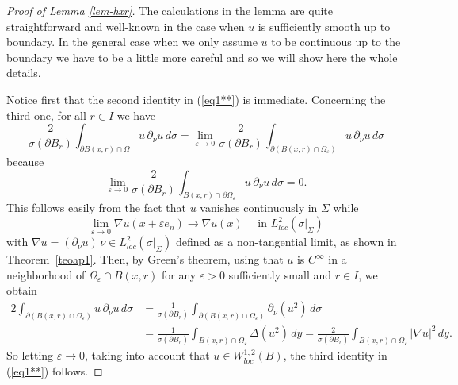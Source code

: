 \documentclass[11pt]{amsart}
\newcommand{\rf}[1]{{(\ref{#1})}}
\newcommand{\ve}{{\varepsilon}}
\theoremstyle{definition}
\theoremstyle{remark}
\numberwithin{equation}{section}
\begin{document}
\begin{proof}[Proof of Lemma \ref{lem-hxr}]
The calculations in the lemma are quite straightforward and well-known in the case when $u$ is
sufficiently smooth up to boundary. In the general case when we only assume $u$ to be continuous
up to the boundary we have to be a little more careful and so we will show here the whole details.

Notice first that the second identity in \rf{eq1**} is immediate. Concerning the third one, for all $r\in I$ we have
$$\frac2{\sigma(\partial B_r)} \int_{\partial B(x,r)\cap \Omega} u\,\partial_\nu  u\,d\sigma
=\lim_{\ve \to 0} \frac2{\sigma(\partial B_r)} \int_{\partial (B(x,r)\cap \Omega_\ve)} u\,\partial_\nu  u\,d\sigma$$
because
$$\lim_{\ve \to 0} \frac2{\sigma(\partial B_r)} \int_{B(x,r)\cap \partial\Omega_\ve} u\,\partial_\nu  u\,d\sigma=0.$$
This follows easily from the fact that $u$ vanishes continuously in $\Sigma$ while 
\begin{equation}\label{eqnablaupart}
\lim_{\ve\to0} \nabla u(x+\ve e_n) \to \nabla u(x) \quad \mbox{ in $L^2_{loc}(\sigma|_\Sigma)$}
\end{equation}
with $\nabla u = (\partial_\nu u) \,\nu\in L^2_{loc}(\sigma|_\Sigma)$ defined as a non-tangential 
limit, as shown in Theorem~\ref{teoap1}.
Then, by Green's theorem, using that $u$ is $C^\infty$ in a neighborhood of $\Omega_\ve\cap B(x,r)$ for any $\ve>0$ sufficiently small and $r\in I$, we obtain
\begin{align*}
2\int_{\partial (B(x,r)\cap \Omega_\ve)} u\,\partial_\nu  u\,d\sigma &= \frac1{\sigma(\partial B_r)} \int_{\partial (B(x,r)\cap \Omega_\ve)} \partial_\nu  (u^2)\,d\sigma\\
& 
= \frac1{\sigma(\partial B_r)} \int_{B(x,r)\cap \Omega_\ve} \Delta (u^2)\,dy 
= \frac2{\sigma(\partial B_r)} \int_{B(x,r)\cap \Omega_\ve} |\nabla u|^2\,dy.
\end{align*}
So letting $\ve\to0$, taking into account that $u\in W^{1,2}_{loc}(B)$, 
the third identity in \rf{eq1**} follows.


\end{proof}
\end{document}
